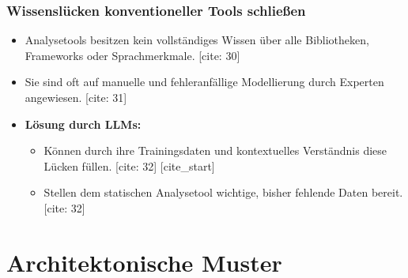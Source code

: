 \documentclass{beamer}
\begin{document}
\begin{frame}
\frametitle{Wissenslücken konventioneller Tools schließen}
\begin{itemize}
    [cite_start]\item Analysetools besitzen kein vollständiges Wissen über alle Bibliotheken, Frameworks oder Sprachmerkmale. [cite: 30] \item Sie sind oft auf manuelle und fehleranfällige Modellierung durch Experten angewiesen. [cite: 31] \pause
    \item \textbf{Lösung durch LLMs:}
    \begin{itemize}
        [cite_start]\item Können durch ihre Trainingsdaten und kontextuelles Verständnis diese Lücken füllen. [cite: 32]
        [cite_start]\item Stellen dem statischen Analysetool wichtige, bisher fehlende Daten bereit. [cite: 32]
    \end{itemize}
\end{itemize}
\end{frame}


\section{Architektonische Muster}
\end{document}
